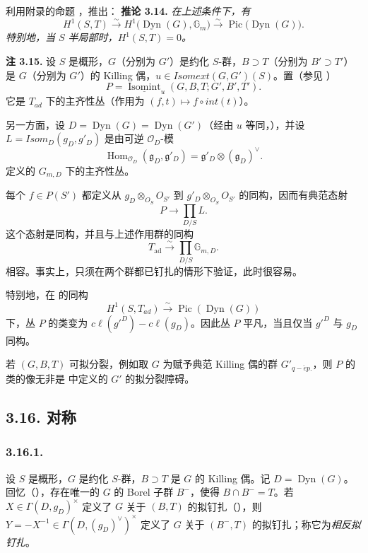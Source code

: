 利用附录的命题 ，推出：
\textbf{推论 3.14.} \emph{在上述条件下，有}
\[
  H^1(S,T)\xrightarrow{\sim}
  H^1\bigl(\operatorname{Dyn}(G),\mathbb G_m\bigr)
  \xrightarrow{\sim}\operatorname{Pic}\bigl(\operatorname{Dyn}(G)\bigr).
\]
\emph{特别地，当 \(S\) 半局部时，\(H^{1}(S, T) = 0\)。}

\textbf{注 3.15.} 设 \(S\) 是概形，\(G\)（分别为 \(G'\)）是约化 \(S\)-群，\(B \supset T\)（分别为 \(B' \supset T'\)）是 \(G\)（分别为 \(G'\)）的 Killing 偶，\(u \in Isomext(G, G')(S)\)。置（参见 ）
\[
  P=\underline{\operatorname{Isomint}}_u(G,B,T;G',B',T').
\]
它是 \(T_{ad}\) 下的主齐性丛（作用为 \((f, t) \mapsto f \circ int(t)\)）。

另一方面，设 \(D = \operatorname{Dyn}(G) = \operatorname{Dyn}(G')\)（经由 \(u\) 等同，），并设 \(L = Isom_{D}(g_{D}, g'_{D})\) 是由可逆 \(\mathcal O_D\)-模
\[
  \operatorname{Hom}_{\mathcal O_D}(\mathfrak g_D,\mathfrak g'_D)
  =\mathfrak g'_D\otimes(\mathfrak g_D)^\vee .
\]
定义的 \(G_{m,D}\) 下的主齐性丛。

每个 \(f \in P(S')\) 都定义从 \(g_{D} \otimes_{O_{S}} O_{S'}\) 到 \(g'_{D} \otimes_{O_{S}} O_{S'}\) 的同构，因而有典范态射
\[ P \to \prod_{D/S} L. \]
这个态射是同构，并且与上述作用群的同构
\[
  T_{\mathrm{ad}}\xrightarrow{\sim}
  \prod_{D/S}\mathbb G_{m,D}.
\]
相容。事实上，只须在两个群都已钉扎的情形下验证，此时很容易。

特别地，在  的同构
\[ H^{1}(S, T_{ad}) \xrightarrow{\sim} \operatorname{Pic}(\operatorname{Dyn}(G)) \]
下，丛 \(P\) 的类变为 \(c\ell(g'^{D}) - c\ell(g_{D})\)。因此丛 \(P\) 平凡，当且仅当 \(g'^{D}\) 与 \(g_{D}\) 同构。

若 \((G, B, T)\) 可拟分裂，例如取 \(G\) 为赋予典范 Killing 偶的群 \(G'_{q-\acute{e}p.}\)，则 \(P\) 的类的像无非是  中定义的 \(G'\) 的拟分裂障碍。

\subsection*{3.16. 对称}
\subsubsection*{3.16.1.}
设 \(S\) 是概形，\(G\) 是约化 \(S\)-群，\(B \supset T\) 是 \(G\) 的 Killing 偶。记 \(D = \operatorname{Dyn}(G)\)。回忆（），存在唯一的 \(G\) 的 Borel 子群 \(B^{-}\)，使得 \(B \cap B^{-} = T\)。若 \(X \in \Gamma(D,g_{D})^{\times}\) 定义了 \(G\) 关于 \((B, T)\) 的拟钉扎（），则 \(Y = -X^{-1} \in \Gamma(D,(g_{D})^{\vee})^{\times}\) 定义了 \(G\) 关于 \((B^{-}, T)\) 的拟钉扎；称它为\emph{相反拟钉扎}。

